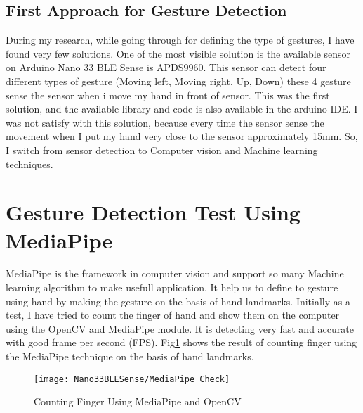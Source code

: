 \subsection{First Approach for Gesture Detection}
During my research, while going through for defining the type of gestures, I have found very few solutions. One of the most visible solution is the available sensor on Arduino Nano 33 BLE Sense is APDS9960. This sensor can detect four different types of gesture (Moving left, Moving right, Up, Down) these 4 gesture sense the sensor when i move my hand in front of sensor. This was the first solution, and the available library and code is also available in the arduino IDE. I was not satisfy with this solution, because every time the sensor sense the movement when I put my hand very close to the sensor approximately 15mm. So, I switch from sensor detection to Computer vision and Machine learning techniques.
\section{Gesture Detection Test Using MediaPipe}
MediaPipe is the framework in computer vision and support so many Machine learning algorithm to make usefull application. It help us to define to gesture using hand by making the gesture on the basis of hand landmarks. Initially as a test, I have tried to count the finger of hand and show them on the computer using the OpenCV and MediaPipe module. It is detecting very fast and accurate with good frame per second (FPS). Fig\ref{Counting Finger Using MediaPipe and OpenCV} shows the result of counting finger using the MediaPipe technique on the basis of hand landmarks.
\begin{figure}[h]
	\centering
	\texttt{[image: Nano33BLESense/MediaPipe Check]}
	\caption{Counting Finger Using MediaPipe and OpenCV}
	\label{Counting Finger Using MediaPipe and OpenCV}
\end{figure}


